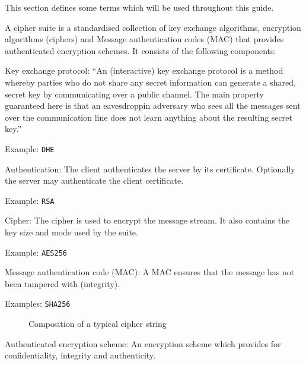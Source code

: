 
This section defines some terms which will be used throughout this guide.


A cipher suite is a standardised collection of key exchange algorithms, encryption 
algorithms (ciphers) and Message authentication codes (MAC) that provides authenticated 
encryption schemes. It consists of the following components:

\begin{description}
\item{Key exchange protocol:}
``An (interactive) key exchange protocol is a method whereby parties who do not 
share any secret information can generate a shared, secret key by communicating 
over a public channel. The main property guaranteed here is that an 
eavesdroppin adversary who sees all the messages sent over the communication 
line does not learn anything about the resulting secret key.'' \cite{katz2008introduction}

Example: \texttt{DHE}

\item{Authentication:}
The client authenticates the server by its certificate. Optionally the server 
may authenticate the client certificate.

Example: \texttt{RSA}

\item{Cipher:}
The cipher is used to encrypt the message stream. It also contains the key size
and mode used by the suite.

Example: \texttt{AES256}

\item{Message authentication code (MAC):}
A MAC ensures that the message has not been tampered with (integrity).

Examples: \texttt{SHA256}


\begin{figure}[h]
\caption{Composition of a typical cipher string}
\end{figure}


\item{Authenticated encryption scheme:}
An encryption scheme which provides for confidentiality, integrity and authenticity.

\end{description}
